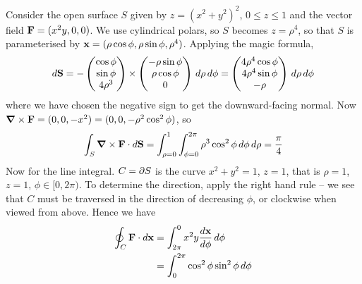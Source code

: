 \documentclass{../template/note}
\begin{document}
    \begin{example*}
        Consider the open surface \(S\) given by \(z = (x^2+y^2)^2\), \(0 \leq z \leq 1\) and the vector field \(\V F = (x^2y, 0, 0)\). We use cylindrical polars, so \(S\) becomes \(z=\rho^4\), so that \(S\) is parameterised by \(\V x = (\rho \cos \phi, \rho \sin \phi, \rho^4)\). Applying the magic formula,
        \begin{align*}
            d\V S = -\begin{pmatrix}
             \cos \phi \\
             \sin \phi \\
             4\rho^3 \\
            \end{pmatrix} \times \begin{pmatrix}
             -\rho \sin \phi \\
             \rho \cos \phi \\
             0 \\
            \end{pmatrix}\D\rho\D\phi = \begin{pmatrix}
             4\rho^4\cos\phi \\
             4\rho^4\sin\phi \\
             -\rho \\
            \end{pmatrix}\D\rho\D\phi
        \end{align*}
        where we have chosen the negative sign to get the downward-facing normal. Now \(\curl \V F = (0, 0, -x^2) = (0, 0, -\rho^2 \cos^2 \phi)\), so
        \begin{align*}
            \int_S \curl \V F \cdot d\V S = \int_{\rho=0}^1 \int_{\phi=0}^{2\pi} \rho^3 \cos^2 \phi \D \phi \D \rho = \frac \pi 4
        \end{align*}
        Now for the line integral. \(C = \partial S\) is the curve \(x^2+y^2=1\), \(z=1\), that is \(\rho = 1\), \(z=1\), \(\phi \in [0, 2\pi)\). To determine the direction, apply the right hand rule -- we see that \(C\) must be traversed in the direction of decreasing \(\phi\), or clockwise when viewed from above. Hence we have
        \begin{align*}
            \oint_C \V F \cdot d\V x &= \int_{2\pi}^0 x^2y \frac{d\V x}{d\phi} \D \phi \\
            &= \int_0^{2\pi} \cos^2\phi \sin^2\phi \D \phi
        \end{align*}       
    \end{example*}
    
\end{document}
